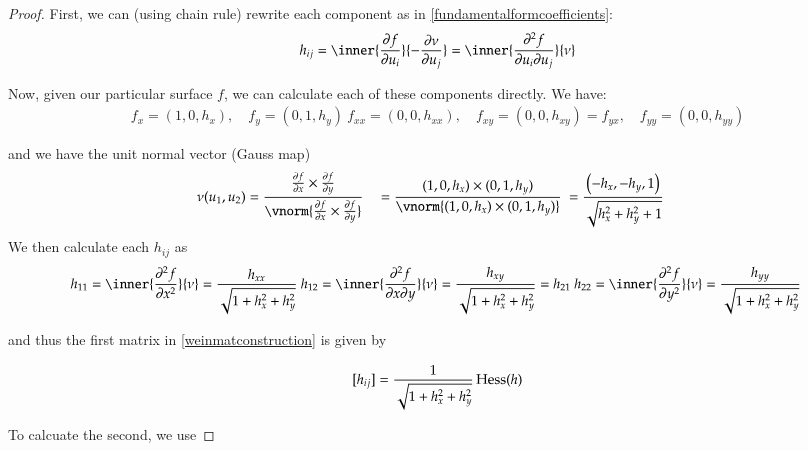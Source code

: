        	\begin{proof}
       		First, we can (using chain rule) rewrite each component as in  \cref{fundamentalformcoefficients}:
      		 \[ h_{ij} = \inner{\frac{\partial f}{\partial u_i}}{-\frac{\partial \nu}{\partial u_j}}
       		= \inner{\frac{\partial^2 f}{\partial u_i \partial u_j}}{\nu} \]
       		
       		Now, given our particular surface $f$, we can calculate each of these components directly. We have:
       		\begin{equation}
       		\begin{gathered}
       		f_{x} = (1, 0, h_x) , \quad
       		f_{y} = (0, 1, h_y)  \
       		f_{xx} = (0, 0, h_{xx}) , \quad
       		f_{xy} = (0, 0, h_{xy}) = f_{yx} , \quad
       		f_{yy} = (0, 0, h_{yy})
       		\end{gathered}
       		\end{equation}
       		
       		and we have the unit normal vector (Gauss map)
       		\begin{align}
       		\nu(u_1, u_2) &=
       		\frac{\frac{\partial f}{\partial x} \times \frac{\partial f}{\partial y}}
       		{\vnorm{\frac{\partial f}{\partial x} \times \frac{\partial f}{\partial y}}} \
       		&= \frac{(1, 0, h_x) \times (0, 1, h_y)}{\vnorm{(1, 0, h_x) \times (0, 1, h_y)}} \
       		&= \frac{\left( -h_x , -h_y , 1 \right)}{\sqrt{h_x^2 + h_y^2 + 1}}
	 \end{align}
	 We then calculate each $h_{ij}$ as
	 \begin{equation}
	 \begin{gathered}
	 h_{11} = \inner{\frac{\partial^2 f}{\partial x^2}}{\nu} = 
		 \frac{h_{xx}}{\sqrt{1+h_x^2 + h_y^2}} \
	  h_{12} = \inner{\frac{\partial^2 f}{\partial x \partial y}}{\nu} = 
	  \frac{h_{xy}}{\sqrt{1+h_x^2 + h_y^2}} = h_{21} \
	  h_{22} = \inner{\frac{\partial^2 f}{\partial y^2}}{\nu} = 
	  \frac{h_{yy}}{\sqrt{1+h_x^2 + h_y^2}} \
	 \end{gathered}
	 \end{equation}
	 
	 and thus the first matrix in \cref{weinmatconstruction} is given by
	 
	 \begin{equation} \label{hij_exactgraph}
	 [h_{ij}] = \frac{1}{\sqrt{1+h_x^2 + h_y^2}} \,  \mathrm{Hess} (h)
	 \end{equation}
	 
	 To calcuate the second, we use
	 

\end{proof}
